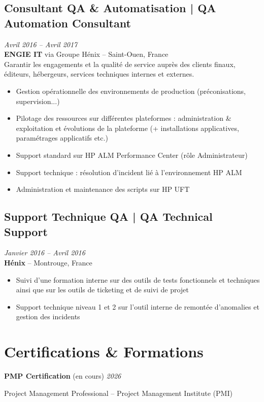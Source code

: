 \documentclass[11pt,a4paper]{article}
\begin{document}
\subsection*{Consultant QA \& Automatisation | QA Automation Consultant} \hfill \textit{Avril 2016 -- Avril 2017}\\
\textbf{ENGIE IT} via Groupe Hénix -- Saint-Ouen, France\\
Garantir les engagements et la qualité de service auprès des clients finaux, éditeurs, hébergeurs, services techniques internes et externes.
\begin{itemize}
    \item Gestion opérationnelle des environnements de production (préconisations, supervision...)
    \item Pilotage des ressources sur différentes plateformes : administration \& exploitation et évolutions de la plateforme (+ installations applicatives, paramétrages applicatifs etc.)
    \item Support standard sur HP ALM Performance Center (rôle Administrateur)
    \item Support technique : résolution d'incident lié à l'environnement HP ALM
    \item Administration et maintenance des scripts sur HP UFT
\end{itemize}

\subsection*{Support Technique QA | QA Technical Support} \hfill \textit{Janvier 2016 -- Avril 2016}\\
\textbf{Hénix} -- Montrouge, France
\begin{itemize}
    \item Suivi d'une formation interne sur des outils de tests fonctionnels et techniques ainsi que sur les outils de ticketing et de suivi de projet
    \item Support technique niveau 1 et 2 sur l'outil interne de remontée d'anomalies et gestion des incidents
\end{itemize}

\section*{Certifications \& Formations}

\textbf{PMP Certification} (en cours) \hfill \textit{2026}

Project Management Professional -- Project Management Institute (PMI)
\end{document}
